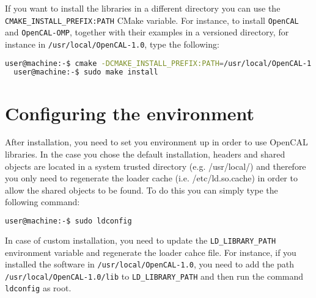 If you want to install the libraries in a different directory you can
use the \texttt{CMAKE\_INSTALL\_PREFIX:PATH} CMake variable. For
instance, to install \verb'OpenCAL' and \verb'OpenCAL-OMP', together
with their examples in a versioned directory, for instance in
\texttt{/usr/local/OpenCAL-1.0}, type the following:

\begin{lstlisting}[numbers=none,language=bash,label={ch:quickstart:sudoinstall}]
  user@machine:-$ cmake -DCMAKE_INSTALL_PREFIX:PATH=/usr/local/OpenCAL-1.0 -DBUILD_EXAMPLES=ON -DBUILD_OPENCAL_OMP=ON ../
  user@machine:-$ sudo make install
\end{lstlisting}





\section{Configuring the environment}
After installation, you need to set you environment up in order to use
OpenCAL libraries. In the case you chose the default installation,
headers and shared objects are located in a system trusted directory
(e.g. /usr/local/) and therefore you only need to regenerate the
loader cache (i.e. /etc/ld.so.cache) in order to allow the shared
objects to be found. To do this you can simply type the following
command:

\begin{lstlisting}[numbers=none,language=bash,label={ch:quickstart:sudoldconfig}]
  user@machine:-$ sudo ldconfig
\end{lstlisting}

In case of custom installation, you need to update the
\verb'LD_LIBRARY_PATH' environment variable and regenerate the loader
cahce file. For instance, if you installed the software in
\verb'/usr/local/OpenCAL-1.0', you need to add the path
\verb'/usr/local/OpenCAL-1.0/lib' to \verb'LD_LIBRARY_PATH' and then
run the command \verb'ldconfig' as root.

